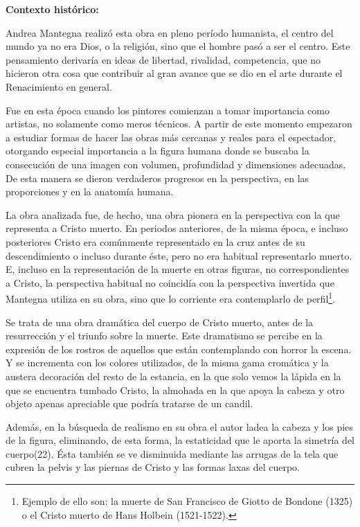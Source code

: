 \textbf{Contexto histórico:}

Andrea Mantegna realizó esta obra en pleno período humanista, el centro del mundo ya no era Dios, o la religión, sino que el hombre pasó a ser el centro. Este pensamiento derivaría en ideas de libertad, rivalidad, competencia, que no hicieron otra cosa que contribuir al gran avance que se dio en el arte durante el Renacimiento en general.

Fue en esta época cuando los pintores comienzan a tomar importancia como artistas, no solamente como meros técnicos. A partir de este momento empezaron a estudiar formas de hacer las obras más cercanas y reales para el espectador, otorgando especial importancia a la figura humana donde se buscaba la consecución de una imagen con volumen, profundidad y dimensiones adecuadas. De esta manera se dieron verdaderos progresos en la perspectiva, en las proporciones y en la anatomía humana.

La obra analizada fue, de hecho, una obra pionera en la perspectiva con la que representa a Cristo muerto. En periodos anteriores, de la misma época, e incluso posteriores Cristo era comúnmente representado en la cruz antes de su descendimiento o incluso durante éste, pero no era habitual representarlo muerto. E, incluso en la representación de la muerte en otras figuras, no correspondientes a Cristo, la perspectiva habitual no coincidía con la perspectiva invertida que Mantegna utiliza en su obra, sino que lo corriente era contemplarlo de perfil\footnote{Ejemplo de ello son: la muerte de San Francisco de Giotto de Bondone (1325) o el Cristo muerto de Hans Holbein (1521-1522).}.

Se trata de una obra dramática del cuerpo de Cristo muerto, antes de la resurrección y el triunfo sobre la muerte. Este dramatismo se percibe en la expresión de los rostros de aquellos que están contemplando con horror la escena. Y se incrementa con los colores utilizados, de la misma gama cromática y la austera decoración del resto de la estancia, en la que solo vemos la lápida en la que se encuentra tumbado Cristo, la almohada en la que apoya la cabeza y otro objeto apenas apreciable que podría tratarse de un candil.

Además, en la búsqueda de realismo en su obra el autor ladea la cabeza y los pies de la figura, eliminando, de esta forma, la estaticidad que le aporta la simetría del cuerpo(22). Ésta también se ve disminuida mediante las arrugas de la tela que cubren la pelvis y las piernas de Cristo y las formas laxas del cuerpo.

